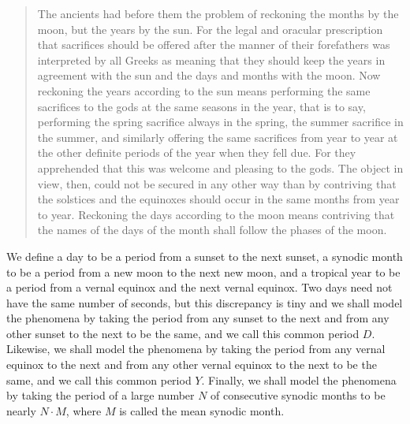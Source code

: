 \documentclass{article}
\begin{document}
\begin{quote}
The ancients had before them the problem
of reckoning the months by the moon, but the years by the sun. For the legal and
oracular prescription that sacrifices should be offered after the
manner of their forefathers was interpreted by all Greeks as meaning
that they should keep the years in agreement with the sun
and the days and months with the moon. Now reckoning the years
according to the sun means performing the same sacrifices to the
gods at the same seasons in the year, that is to say, performing
the spring sacrifice always in the spring, the summer sacrifice
in the summer, and similarly offering the same sacrifices from year
to year at the other definite periods of the year when they fell due.
For they apprehended that this was welcome and pleasing to the
gods. The object in view, then, could not be secured in any other
way than by contriving that the solstices and the equinoxes should
occur in the same months from year to year. Reckoning the days
according to the moon means contriving that the names of the
days of the month shall follow the phases of the moon.
\end{quote}

We define
a day to be a period
from a sunset to the next sunset,
a  synodic month to be a period from a new moon to the next new moon, and
a tropical year to be a period from a vernal equinox and the next vernal equinox.
Two days need not have the same number of seconds, but this discrepancy is tiny and 
we shall model the phenomena by taking the period from any sunset to the next and from any other sunset to the next to be the same, and we
call this common period $D$. Likewise, 
we shall model the phenomena by taking the period from any vernal equinox to the next and from any other vernal equinox to the next
to be the same, and we call this common period $Y$. 
Finally, we shall model the phenomena by taking the period of a large number $N$ of consecutive synodic months to be nearly $N \cdot M$, where $M$ is called
the mean synodic month.
\end{document}
